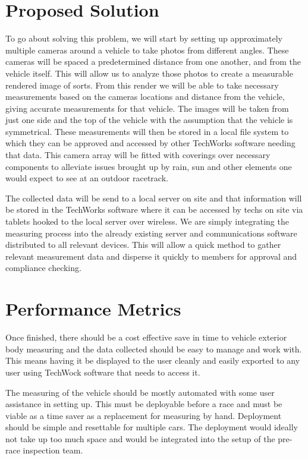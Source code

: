 \documentclass[draftclsnofoot,onecolumn,letterpaper,10pt,compsoc]{IEEEtran}
\begin{document}
\section*{Proposed Solution}
    
To go about solving this problem, we will start by setting up approximately multiple cameras around a vehicle to take photos from different angles. These cameras will be spaced a predetermined distance from one another, and from the vehicle itself. This will allow us to analyze those photos to create a measurable rendered image of sorts. From this render we will be able to take necessary measurements based on the cameras locations and distance from the vehicle, giving accurate measurements for that vehicle. The images will be taken from just one side and the top of the vehicle with the assumption that the vehicle is symmetrical. These measurements will then be stored in a local file system to which they can be approved and accessed by other TechWorks software needing that data. This camera array will be fitted with coverings over necessary components to alleviate issues brought up by rain, sun and other elements one would expect to see at an outdoor racetrack.
    
\noindent The collected data will be send to a local server on site and that information will be stored in the TechWorks software where it can be accessed by techs on site via tablets hooked to the local server over wireless. We are simply integrating the measuring process into the already existing server and communications software distributed to all relevant devices. This will allow a quick method to gather relevant measurement data and disperse it quickly to members for approval and compliance checking.

\section*{Performance Metrics}
Once finished, there should be a cost effective save in time to vehicle exterior body measuring and the data collected should be easy to manage and work with. This means having it be displayed to the user cleanly and easily exported to any user using TechWock software that needs to access it.
    
\noindent The measuring of the vehicle should be mostly automated with some user assistance in setting up. This must be deployable before a race and must be viable as a time saver as a replacement for measuring by hand. Deployment should be simple and resettable for multiple cars. The deployment would ideally not take up too much space and would be integrated into the setup of the pre-race inspection team.
    
\end{document}
